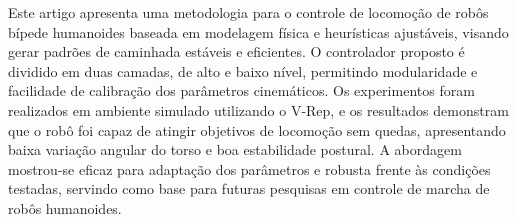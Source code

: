 
\begin{resumo} 
Este artigo apresenta uma metodologia para o controle de locomoção de robôs bípede humanoides baseada em modelagem física e heurísticas ajustáveis, visando gerar padrões de caminhada estáveis e eficientes. O controlador proposto é dividido em duas camadas, de alto e baixo nível, permitindo modularidade e facilidade de calibração dos parâmetros cinemáticos. Os experimentos foram realizados em ambiente simulado utilizando o V-Rep, e os resultados demonstram que o robô foi capaz de atingir objetivos de locomoção sem quedas, apresentando baixa variação angular do torso e boa estabilidade postural. A abordagem mostrou-se eficaz para adaptação dos parâmetros e robusta frente às condições testadas, servindo como base para futuras pesquisas em controle de marcha de robôs humanoides.
\end{resumo}


